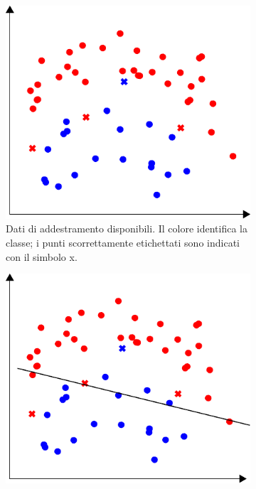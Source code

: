 \begin{figure}
    \begin{subfigure}[t]{.45\textwidth}
        \centering
        \includegraphics[width=\textwidth]{img/under_over_fitting_1.pdf}
        \caption{Dati di addestramento disponibili. Il colore identifica la classe; i punti scorrettamente etichettati sono indicati con il simbolo x.}
    \end{subfigure}%
    \hfill
    \begin{subfigure}[t]{.45\textwidth}
        \centering
        \includegraphics[width=\textwidth]{img/under_over_fitting_2.pdf}

\end{subfigure}
\end{figure}
